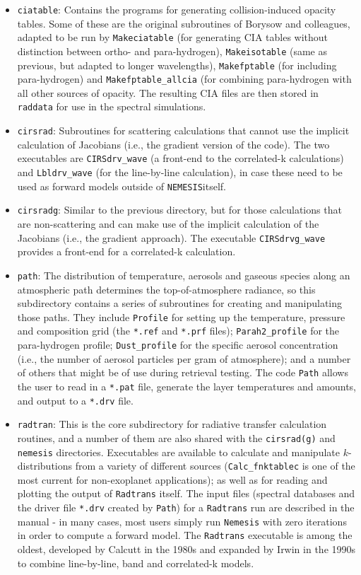 \documentclass[final,5p,times,twocolumn,authoryear]{elsarticle}
\begin{document}
\begin{itemize}
    \item \verb#ciatable#:  Contains the programs for generating collision-induced opacity tables.  Some of these are the original subroutines of Borysow and colleagues, adapted to be run by \verb#Makeciatable# (for generating CIA tables without distinction between ortho- and para-hydrogen),  \verb#Makeisotable# (same as previous, but adapted to longer wavelengths), \verb#Makefptable# (for including para-hydrogen) and \verb#Makefptable_allcia# (for combining para-hydrogen with all other sources of opacity.  The resulting CIA files are then stored in \verb#raddata# for use in the spectral simulations.
    \item \verb#cirsrad#:  Subroutines for scattering calculations that cannot use the implicit calculation of Jacobians (i.e., the gradient version of the code).  The two executables are \verb#CIRSdrv_wave# (a front-end to the correlated-k calculations) and \verb#Lbldrv_wave# (for the line-by-line calculation), in case these need to be used as forward models outside of \verb#NEMESIS#itself.
    \item \verb#cirsradg#:  Similar to the previous directory, but for those calculations that are non-scattering and can make use of the implicit calculation of the Jacobians (i.e., the gradient approach).  The executable \verb#CIRSdrvg_wave# provides a front-end for a correlated-k calculation. 
    \item \verb#path#:  The distribution of temperature, aerosols and gaseous species along an atmospheric path determines the top-of-atmosphere radiance, so this subdirectory contains a series of subroutines for creating and manipulating those paths.  They include \verb#Profile# for setting up the temperature, pressure and composition grid (the \verb#*.ref# and \verb#*.prf# files); \verb#Parah2_profile# for the para-hydrogen profile; \verb#Dust_profile# for the specific aerosol concentration (i.e., the number of aerosol particles per gram of atmosphere); and a number of others that might be of use during retrieval testing.  The code \verb#Path# allows the user to read in a \verb#*.pat# file, generate the layer temperatures and amounts, and output to a \verb#*.drv# file.
    \item \verb#radtran#:  This is the core subdirectory for radiative transfer calculation routines, and a number of them are also shared with the \verb#cirsrad(g)# and \verb#nemesis# directories.  Executables are available to calculate and manipulate $k$-distributions from a  variety of different sources (\verb#Calc_fnktablec# is one of the most current for non-exoplanet applications); as well as for reading and plotting the output of \verb#Radtrans# itself.  The input files (spectral databases and the driver file \verb#*.drv# created by \verb#Path#) for a \verb#Radtrans# run are described in the manual - in many cases, most users simply run \verb#Nemesis# with zero iterations in order to compute a forward model.  The \verb#Radtrans# executable is among the oldest, developed by Calcutt in the 1980s and expanded by Irwin in the 1990s to combine line-by-line, band and correlated-k models.   

\end{itemize}
\end{document}

